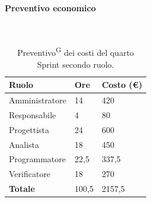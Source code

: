 \documentclass[8pt]{article}
\newcommand{\glossterm}[1]{#1\textsuperscript{G}} %
\newcommand{\subsubsubsection}[1]{\paragraph{#1}\mbox{}\\}
\begin{document}
\subsubsubsection{Preventivo economico}
\begin{table}[ht!]
	\centering
	\begin{tabular}{p{4cm} p{1cm} p{2cm}}
        \toprule
        \textbf{Ruolo} & \textbf{Ore} & \textbf{Costo (€)} \\
        \midrule
        Amministratore & 14 & 420 \\
        Responsabile & 4 & 80 \\
        Progettista & 24 & 600 \\
        Analista & 18 & 450 \\
        Programmatore & 22,5 & 337,5 \\
        Verificatore & 18 & 270 \\
        \bottomrule
        \textbf{Totale} & 100,5 & 2157,5
    \end{tabular}
    \caption{\glossterm{Preventivo} dei costi del quarto Sprint secondo ruolo.}
	\label{table:Preventivo dei costi del quarto Sprint secondo ruolo}
\end{table}
\end{document}
